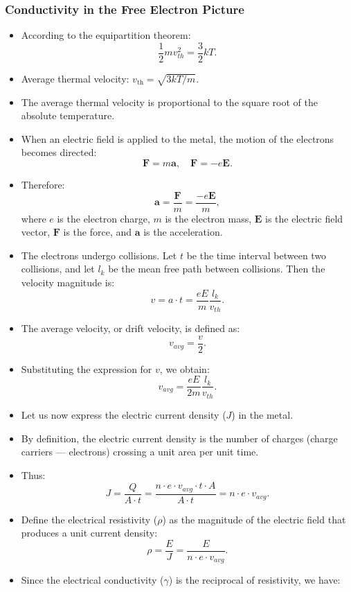 \documentclass[t,aspectratio=169]{beamer}
\begin{document}

\begin{frame}
 \frametitle{Conductivity in the Free Electron Picture}
\begin{itemize}
\item According to the equipartition theorem: $$\frac{1}{2}mv_{th}^{2}=\frac{3}{2}kT.$$
\item Average thermal velocity: $v_{\mathrm{th}} = \sqrt{3kT/m}$.
\item The average thermal velocity is proportional to the square root of the absolute temperature.
\item When an electric field is applied to the metal, the motion of the electrons becomes directed: $$\mathbf{F}=m\mathbf{a}, \quad \mathbf{F}=-e\mathbf{E}.$$
 \pagebreak
\item Therefore: $$\mathbf{a}=\frac{\mathbf{F}}{m}=\frac{-e\mathbf{E}}{m},$$ where $e$ is the electron charge, $m$ is the electron mass, $\mathbf{E}$ is the electric field vector, $\mathbf{F}$ is the force, and $\mathbf{a}$ is the acceleration.
\item The electrons undergo collisions. Let $t$ be the time interval between two collisions, and let $l_{k}$ be the mean free path between collisions. Then the velocity magnitude is:  
$$v=a\cdot t=\frac{eE}{m}\frac{l_{k}}{v_{th}}.$$
\item The average velocity, or drift velocity, is defined as: $$v_{avg}=\frac{v}{2}.$$
\pagebreak
\item Substituting the expression for $v$, we obtain: $$v_{avg}=\frac{eE}{2m}\frac{l_{k}}{v_{th}}.$$
\item Let us now express the electric current density ($J$) in the metal.
\item By definition, the electric current density is the number of charges (charge carriers — electrons) crossing a unit area per unit time.
\item Thus: $$J=\frac{Q}{A\cdot t}=\frac{n\cdot e\cdot v_{avg}\cdot t\cdot A}{A\cdot t}=n\cdot e\cdot v_{avg}.$$
\pagebreak
\item Define the electrical resistivity ($\rho$) as the magnitude of the electric field that produces a unit current density:  
$$\rho=\frac{E}{J}=\frac{E}{n\cdot e\cdot v_{avg}}.$$
\item Since the electrical conductivity ($\gamma$) is the reciprocal of resistivity, we have:  

\end{itemize}
\end{frame}
\end{document}
